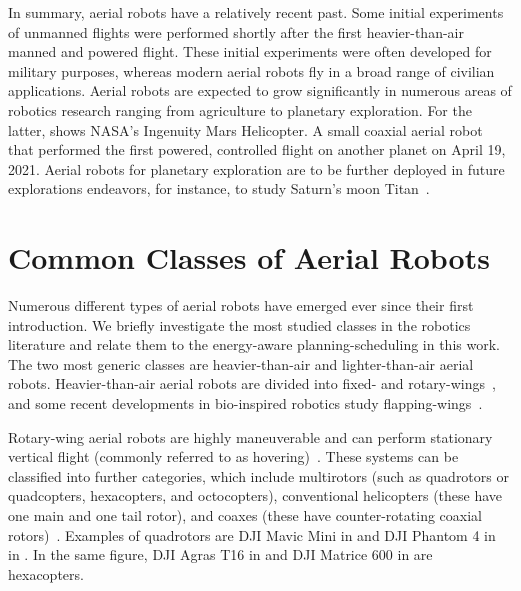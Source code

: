 In summary, aerial robots have a relatively recent past. Some initial experiments of unmanned flights were performed shortly after the first heavier-than-air manned and powered flight. These initial experiments were often developed for military purposes, whereas modern aerial robots fly in a broad range of civilian applications. Aerial robots are expected to grow significantly in numerous areas of robotics research ranging from agriculture to planetary exploration. For the latter,  shows NASA's Ingenuity Mars Helicopter. A small coaxial aerial robot that performed the first powered, controlled flight on another planet on April 19, 2021. Aerial robots for planetary exploration are to be further deployed in future explorations endeavors, for instance, to study Saturn's moon Titan~\citep{voosen2019nasa}.


\section{Common Classes of Aerial Robots}
\label{sec:aerial-robo-types}

Numerous different types of aerial robots have emerged ever since their first introduction. We briefly investigate the most studied classes in the robotics literature and relate them to the energy-aware planning-scheduling in this work. The two most generic classes are heavier-than-air and lighter-than-air aerial robots. Heavier-than-air aerial robots are divided into fixed- and rotary-wings~\citep{siciliano2016springer}, and some recent developments in bio-inspired robotics study flapping-wings~\citep{floreano2015science}. 

Rotary-wing aerial robots are highly maneuverable and can perform stationary vertical flight (commonly referred to as hovering)~\citep{siciliano2016springer}. These systems can be classified into further categories, which include multirotors (such as quadrotors or quadcopters, hexacopters, and octocopters), conventional helicopters (these have one main and one tail rotor), and coaxes (these have counter-rotating coaxial rotors)~\citep{corke2017robotics}. Examples of quadrotors are DJI Mavic Mini in  and DJI Phantom 4 in  in . In the same figure, DJI Agras T16 in  and DJI Matrice 600 in  are hexacopters.

